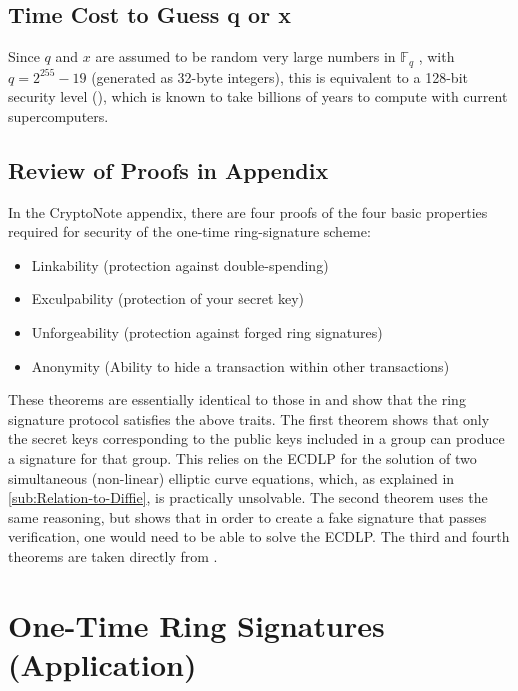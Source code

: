 \documentclass[12pt,english]{mrl}
\numberwithin{equation}{section}
\numberwithin{figure}{section}
\begin{document}
\subsection{\label{sub:Time-Cost-to}Time Cost to Guess q or x }

Since $q$ and $x$ are assumed to be random very large numbers in
$\mathbb{F}_{q}$ , with $q=2^{255}-19$ (generated as 32-byte
integers), this is equivalent to a 128-bit security level (\cite{BCPM}),
which is known to take billions of years to compute with current supercomputers. 


\subsection{Review of Proofs in Appendix}

In the CryptoNote appendix, there are four proofs of the four basic
properties required for security of the one-time ring-signature scheme:
\begin{itemize}
\item Linkability (protection against double-spending)
\item Exculpability (protection of your secret key)
\item Unforgeability (protection against forged ring signatures)
\item Anonymity (Ability to hide a transaction within other transactions)
\end{itemize}
These theorems are essentially identical to those in \cite{FS} and show that
the ring signature protocol satisfies the above traits. The first
theorem shows that only the secret keys corresponding
to the public keys included in a group can produce a signature for
that group. This relies on the ECDLP for the solution of two simultaneous
(non-linear) elliptic curve equations, which, as explained in \ref{sub:Relation-to-Diffie},
is practically unsolvable. The second theorem uses the same reasoning,
but shows that in order to create a fake signature that passes verification, 
one would need to be able to solve the ECDLP. The third and fourth theorems 
are taken directly from \cite{FS}.

\section{One-Time Ring Signatures (Application)}
\end{document}
